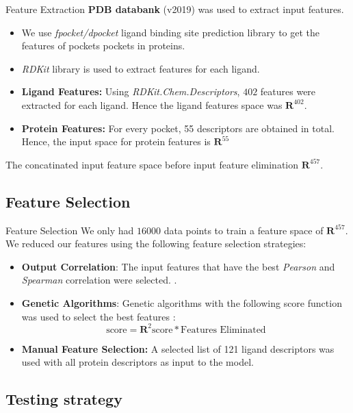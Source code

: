 \documentclass{beamer}
\begin{document}
\begin{frame}[t]{Feature Extraction}
\textbf{PDB databank} (v2019) was used to extract input features.
\begin{itemize}
\item We use \textit{fpocket/dpocket} ligand binding site prediction library to get the features of pockets pockets in proteins.
\item \textit{RDKit} library is used to extract features for each ligand.
\item \textbf{Ligand Features:} Using \textit{RDKit.Chem.Descriptors}, $402$ features were extracted for each ligand.  Hence the ligand features space was $\mathbf{R}^{402}$.
\item \textbf{Protein Features:} For every pocket,  55 descriptors are obtained in total. Hence, the input space for protein features is $\mathbf{R}^{55}$
\end{itemize}
The concatinated input feature space before input feature elimination $\mathbf{R}^{457}$.

\end{frame}

\subsection{Feature Selection}

\begin{frame}[t]{Feature Selection}
We only had $16000$ data points to train a feature space of $\mathbf{R}^{457}$. 
We reduced our features using the following feature selection strategies:
\begin{itemize}
\item \textbf{Output Correlation}: The input features that have the best \textit{Pearson} and \textit{Spearman} correlation were selected. \cite{spearmanpearsoncorrelation}.
\item \textbf{Genetic Algorithms}: Genetic algorithms with the following score function was used to select the best features \cite{geneticalgorithmsresearchpaper}:
$$
\textrm{score} = \mathbf{R}^2 \textrm{score} * \textrm{Features Eliminated}
$$
\item \textbf{Manual Feature Selection:} A selected list of 121 ligand descriptors was
used with all protein descriptors as input to the model.
\end{itemize} 
\end{frame}

\subsection{Testing strategy}
\end{document}
